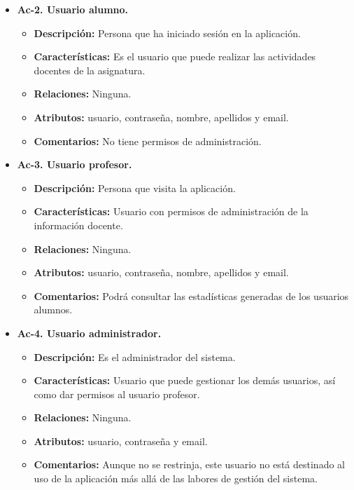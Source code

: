 \begin{itemize}
  \item \textbf{Ac-2. Usuario alumno.}
  \begin{itemize}
   \item \textbf{Descripción:} Persona que ha iniciado sesión en la aplicación.
   \item \textbf{Características:} Es el usuario que puede realizar las actividades docentes de la asignatura.
   \item \textbf{Relaciones:} Ninguna.
   \item \textbf{Atributos:} usuario, contraseña, nombre, apellidos y email.
   \item \textbf{Comentarios:} No tiene permisos de administración.
  \end{itemize}
\end{itemize}

\begin{itemize}
  \item \textbf{Ac-3. Usuario profesor.}
  \begin{itemize}
   \item \textbf{Descripción:} Persona que visita la aplicación.
   \item \textbf{Características:} Usuario con permisos de administración de la información docente.
   \item \textbf{Relaciones:} Ninguna.
   \item \textbf{Atributos:} usuario, contraseña, nombre, apellidos y email.
   \item \textbf{Comentarios:} Podrá consultar las estadísticas generadas de los usuarios alumnos.
  \end{itemize}
\end{itemize}

\begin{itemize}
  \item \textbf{Ac-4. Usuario administrador.}
  \begin{itemize}
   \item \textbf{Descripción:} Es el administrador del sistema.
   \item \textbf{Características:} Usuario que puede gestionar los demás usuarios, así como dar permisos al usuario profesor.
   \item \textbf{Relaciones:} Ninguna.
   \item \textbf{Atributos:} usuario, contraseña y email.
   \item \textbf{Comentarios:} Aunque no se restrinja, este usuario no está destinado al uso de la aplicación más allá de las labores de gestión del sistema.
  \end{itemize}
\end{itemize}


